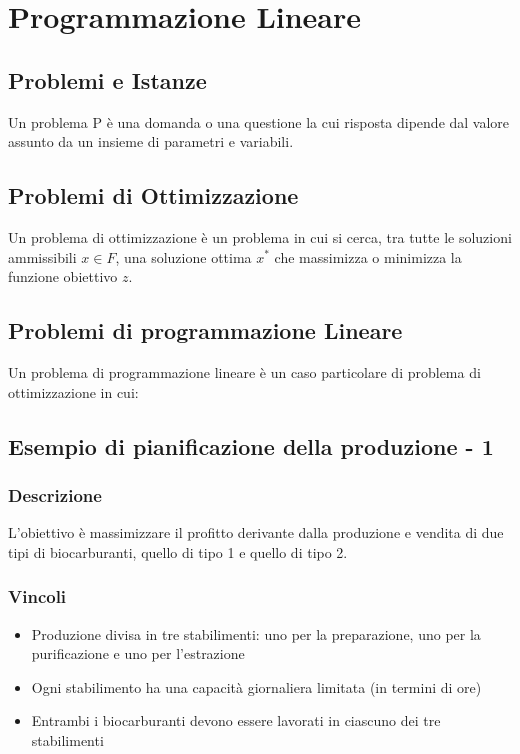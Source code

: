 \chapter{Programmazione Lineare}

\section{Problemi e Istanze}
Un problema P è una domanda o una questione la cui risposta dipende dal valore assunto da un insieme di parametri e variabili.

\section{Problemi di Ottimizzazione}
Un problema di ottimizzazione è un problema in cui si cerca, tra tutte le soluzioni ammissibili $x \in F$, una soluzione ottima $x^*$ che massimizza o minimizza la funzione obiettivo $z$.

\section{Problemi di programmazione Lineare}
Un problema di programmazione lineare è un caso particolare di problema di ottimizzazione in cui:

\section{Esempio di pianificazione della produzione - 1}

\subsection{Descrizione}
L'obiettivo è massimizzare il profitto derivante dalla produzione e vendita di due tipi di biocarburanti, quello di tipo 1 e quello di tipo 2.

\subsection{Vincoli}
\begin{itemize}
    \item Produzione divisa in tre stabilimenti: uno per la preparazione, uno per la purificazione e uno per l'estrazione
    \item Ogni stabilimento ha una capacità giornaliera limitata (in termini di ore)
    \item Entrambi i biocarburanti devono essere lavorati in ciascuno dei tre stabilimenti
\end{itemize}

